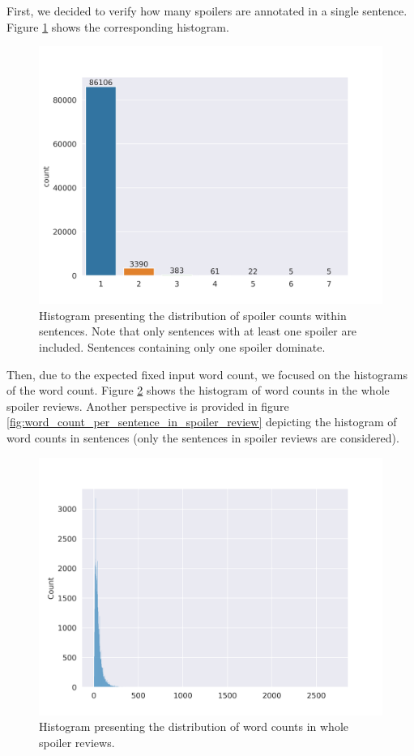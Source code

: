 \documentclass[11pt]{article}
\begin{document}
First, we decided to verify how many spoilers are annotated in a single sentence. Figure \ref{fig:spoilers-per-sentence} shows the corresponding histogram.

\begin{figure}
    \centering
    \includegraphics[width=\columnwidth]{img/eda/spoilers_per_sentence.png}
    \caption{Histogram presenting the distribution of spoiler counts within sentences. Note that only sentences with at least one spoiler are included. Sentences containing only one spoiler dominate.} 
    \label{fig:spoilers-per-sentence}
\end{figure}

Then, due to the expected fixed input word count, we focused on the histograms of the word count. Figure \ref{fig:words_count_per_spoiler_review} shows the histogram of word counts in the whole spoiler reviews. Another perspective is provided in figure \ref{fig:word_count_per_sentence_in_spoiler_review} depicting the histogram of word counts in sentences (only the sentences in spoiler reviews are considered). 

\begin{figure}
    \centering
    \includegraphics[width=\columnwidth]{img/eda/word_count_per_spoiler_review.png}
    \caption{Histogram presenting the distribution of word counts in whole spoiler reviews.} 
    \label{fig:words_count_per_spoiler_review}
\end{figure}
\end{document}
